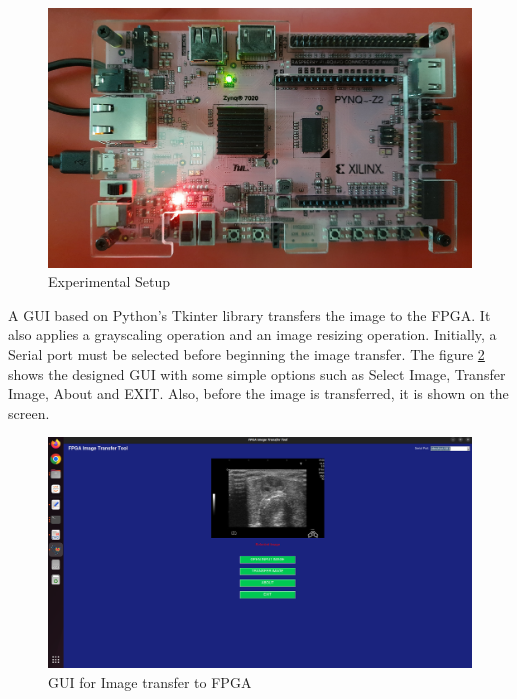     \begin{figure}[H]
        \centering
        \includegraphics[width=1\linewidth]{images/expSetup.jpg}
        \caption{Experimental Setup}
        \label{fig:expSetup}
    \end{figure}

    \noindent
    A GUI based on Python's Tkinter library transfers the image to the FPGA. It also applies a grayscaling operation and an image resizing operation. Initially, a Serial port must be selected before beginning the image transfer. The figure \ref{fig:gui}  shows the designed GUI with some simple options such as Select Image, Transfer Image, About and EXIT. Also, before the image is transferred, it is shown on the screen.

    \begin{figure}[H]
        \centering
        \includegraphics[width=1\linewidth]{images/gui.png}
        \caption{GUI for Image transfer to FPGA}
        \label{fig:gui}
    \end{figure}

